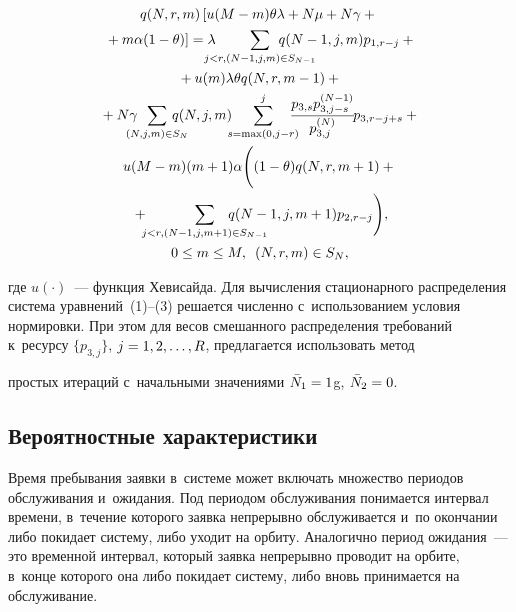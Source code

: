 \begin{multicols}{2}
\vspace*{-12pt}

\noindent
\begin{multline}
 q(N,r,m) \left[ u(M-m)\theta\lambda +N\mu + N\gamma +{}\right.\\
 \left.{}+ m\alpha(1-\theta) 
\right] = \lambda \!\!\!\!\!\! \sum\limits_{j<r, (N-1,j,m) \in S_{N-1}} \!\!\!\!\!\!\!\!\!\!\!\!\!\!\!\!\!
q(N-1,j,m)p_{1,r-j} + {} \\
{}+u(m) \lambda \theta q(N,r,m-1) + {}\\
{}+ N\gamma \!\!\!\!\!\! \sum\limits_{(N,j,m) \in S_N} 
\!\!\!\!\!\!\!\! q(N,j,m) \!\!\!\sum\limits_{s=\max(0,j-r)}^j \! \!\!\!\!\fr{ p_{3,s} p_{3,j-s}^{(N-1)} }{ 
p_{3,j}^{(N)} } \!p_{3,r-j+s} + {}\\
u(M-m)(m+1)\alpha
\Bigg( (1-\theta)q(N,r,m+1) + {}\\
{}+\!\!\! \sum\limits_{j<r, (N-1,j,m+1) \in 
S_{N-1}} \!\!\!\!\!\!\!\!\!\!\!\!\!\!\!\!\!\! q(N-1,j,m+1)p_{2,r-j} \Bigg),\\
 0 \leq m \leq M, \enskip (N,r,m) \in S_N,
\end{multline}


\noindent
где $u(\cdot)$~--- 
функ\-ция Хевисайда. Для вы\-чис\-ле\-ния 
стационарного распределения сис\-те\-ма уравнений~(1)--(3) решается чис\-лен\-но 
с~использованием условия нормировки. При этом для весов смешанного распределения 
требований к~ресурсу $\{ p_{3 ,j}\}$, $j\hm=1,2,\ldots ,R$, предлагается использовать 
метод\linebreak
\vspace*{-12pt}

\pagebreak
\noindent
прос\-тых итераций с~начальными значениями \mbox{$\bar{N}_1\hm=1$}g, $\bar{N}_2\hm=0$.


\subsection{Вероятностные характеристики} %

Время пребывания заявки в~сис\-те\-ме может включать множество периодов обслуживания
 и~ожидания. Под периодом обслуживания понимается интервал времени, в~течение 
которого за\-яв\-ка непрерывно обслуживается и~по окончании либо покидает сис\-те\-му, 
либо уходит на орбиту. Аналогично период ожидания~--- это временной интервал, 
который за\-яв\-ка непрерывно проводит на орбите, в~конце которого она либо покидает 
сис\-те\-му, либо вновь принимается на обслуживание.



\end{multicols}
